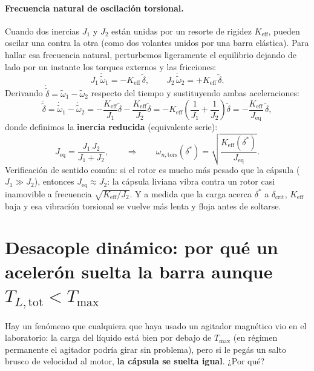 \documentclass[11pt,a4paper,oneside]{book}
\begin{document}
\paragraph{Frecuencia natural de oscilación torsional.}
Cuando dos inercias $J_1$ y $J_2$ están unidas por un resorte de rigidez
$K_{\text{eff}}$, pueden oscilar una contra la otra (como dos volantes unidos
por una barra elástica). Para hallar esa frecuencia natural, perturbemos
ligeramente el equilibrio dejando de lado por un instante los torques externos
y las fricciones:
\[
  J_1\,\dot{\tilde\omega}_1 = -K_{\text{eff}}\,\tilde\delta,
  \qquad
  J_2\,\dot{\tilde\omega}_2 = +K_{\text{eff}}\,\tilde\delta.
\]
Derivando $\dot{\tilde\delta} = \tilde\omega_1 - \tilde\omega_2$ respecto del
tiempo y sustituyendo ambas aceleraciones:
\[
  \ddot{\tilde\delta}
  = \dot{\tilde\omega}_1 - \dot{\tilde\omega}_2
  = -\frac{K_{\text{eff}}}{J_1}\tilde\delta - \frac{K_{\text{eff}}}{J_2}\tilde\delta
  = -K_{\text{eff}}\left(\frac{1}{J_1} + \frac{1}{J_2}\right)\tilde\delta
  = -\frac{K_{\text{eff}}}{J_{\text{eq}}}\,\tilde\delta,
\]
donde definimos la \textbf{inercia reducida} (equivalente serie):
\begin{equation}
  J_{\text{eq}} = \frac{J_1\,J_2}{J_1 + J_2},
  \qquad\Longrightarrow\qquad
  \omega_{n,\text{tors}}(\delta^\ast) = \sqrt{\frac{K_{\text{eff}}(\delta^\ast)}{J_{\text{eq}}}}.
  \label{eq:wn_torsional}
\end{equation}
Verificación de sentido común: si el rotor es mucho más pesado que la cápsula
($J_1 \gg J_2$), entonces $J_{\text{eq}} \approx J_2$: la cápsula liviana vibra
contra un rotor casi inamovible a frecuencia $\sqrt{K_{\text{eff}}/J_2}$. Y a
medida que la carga acerca $\delta^\ast$ a $\delta_{\text{crit}}$, $K_{\text{eff}}$
baja y esa vibración torsional se vuelve más lenta y floja antes de soltarse.

\section{Desacople dinámico: por qué un acelerón suelta la barra aunque \texorpdfstring{$T_{L,\text{tot}} < T_{\max}$}{TL,tot < Tmax}}

Hay un fenómeno que cualquiera que haya usado un agitador magnético vio en el
laboratorio: la carga del líquido está bien por debajo de $T_{\max}$ (en régimen
permanente el agitador podría girar sin problema), pero si le pegás un salto
brusco de velocidad al motor, \textbf{la cápsula se suelta igual}. ¿Por qué?
\end{document}
